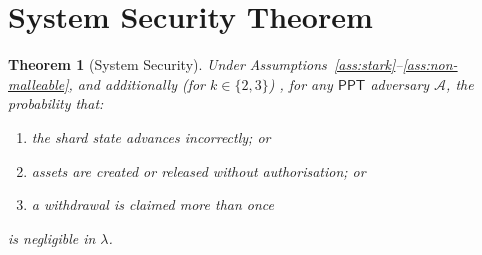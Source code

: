 \documentclass[11pt,a4paper]{article}
\newtheorem{theorem}{Theorem}[section]
\newcommand{\PPT}{\mathsf{PPT}}
\newcommand{\Adv}{\mathcal{A}}
\begin{document}
\section{System Security Theorem}\label{sec:main}

\begin{theorem}[System Security]\label{thm:system}
Under Assumptions~\ref{ass:stark}--\ref{ass:non-malleable}, and additionally (for $k \in \{2, 3\}$) , for any $\PPT$ adversary $\Adv$, the probability that:
\begin{enumerate}[nosep]
    \item the shard state advances incorrectly; or
    \item assets are created or released without authorisation; or
    \item a withdrawal is claimed more than once
\end{enumerate}
is negligible in $\lambda$.
\end{theorem}
\end{document}
